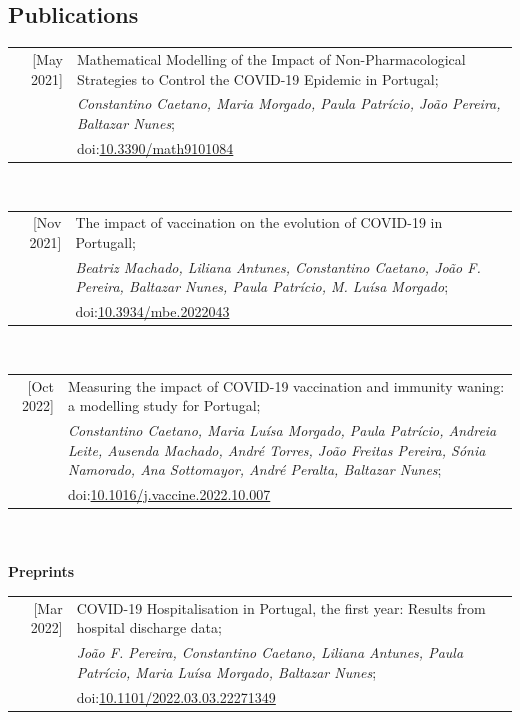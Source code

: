 \documentclass[11pt,oneside,a4paper,titlepage]{article}
\begin{document}
%
\subsection{  Publications}
\begin{tabular}{N P}
[May 2021] & Mathematical Modelling of the Impact of Non-Pharmacological Strategies to Control the COVID-19 Epidemic in Portugal;\\
& \textit{Constantino Caetano, Maria Morgado, Paula Patrício, João Pereira, Baltazar Nunes};\\
& doi:\href{https://doi.org/10.3390/math9101084}{10.3390/math9101084}\\
\end{tabular}
\\
\begin{tabular}{N P}
[Nov 2021] & The impact of vaccination on the evolution of COVID-19 in Portugall;\\
& \textit{Beatriz Machado, Liliana Antunes, Constantino Caetano, João F. Pereira, Baltazar Nunes, Paula Patrício, M. Luísa Morgado};\\
& doi:\href{https://doi.org/10.3934/mbe.2022043}{10.3934/mbe.2022043}\\
\end{tabular}
\\
\begin{tabular}{N P}
[Oct 2022] & Measuring the impact of COVID-19 vaccination and immunity waning: a modelling study for Portugal;\\
& \textit{Constantino Caetano, Maria Luísa Morgado, Paula Patrício, Andreia Leite, Ausenda Machado, André Torres, João Freitas Pereira, Sónia Namorado, Ana Sottomayor, André Peralta, Baltazar Nunes};\\
& doi:\href{https://doi.org/10.1016/j.vaccine.2022.10.007}{10.1016/j.vaccine.2022.10.007}\\
\end{tabular}
\\
\\
\textcolor{textGrey}{\textbf{Preprints}}
\\
\begin{tabular}{N P}
[Mar 2022] & COVID-19 Hospitalisation in Portugal, the first year: Results from hospital discharge data;\\
& \textit{João F. Pereira, Constantino Caetano, Liliana Antunes, Paula Patrício, Maria Luísa Morgado, Baltazar Nunes};\\
& doi:\href{https://doi.org/10.1101/2022.03.03.22271349}{10.1101/2022.03.03.22271349}\\
\end{tabular}
\end{document}
